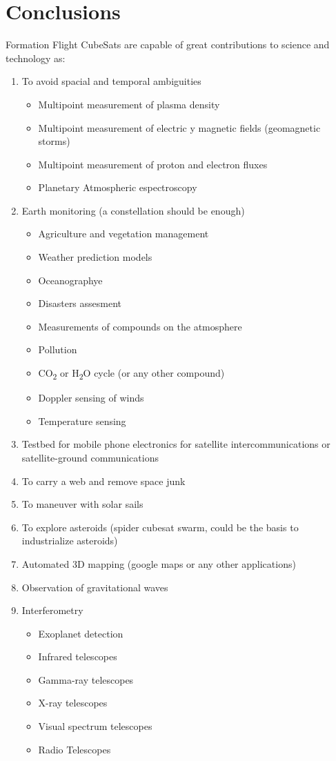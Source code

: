 \section{Conclusions}
Formation Flight CubeSats are capable of great contributions to science
and technology as:
\begin{enumerate}
\item To avoid spacial and temporal ambiguities

\begin{itemize}
\item Multipoint measurement of plasma density
\item Multipoint measurement of electric y magnetic fields (geomagnetic
storms)
\item Multipoint measurement of proton and electron fluxes
\item Planetary Atmospheric espectroscopy
\end{itemize}
\item Earth monitoring (a constellation should be enough)

\begin{itemize}
\item Agriculture and vegetation management
\item Weather prediction models
\item Oceanographye
\item Disasters assesment
\item Measurements of compounds on the atmosphere
\item Pollution
\item CO\textsubscript{2} or H\textsubscript{2}O cycle (or any other compound)
\item Doppler sensing of winds
\item Temperature sensing
\end{itemize}
\item Testbed for mobile phone electronics for satellite intercommunications
or satellite-ground communications
\item To carry a web and remove space junk
\item To maneuver with solar sails
\item To explore asteroids (spider cubesat swarm, could be the basis to
industrialize asteroids)
\item Automated 3D mapping (google maps or any other applications)
\item Observation of gravitational waves
\item Interferometry

\begin{itemize}
\item Exoplanet detection
\item Infrared telescopes
\item Gamma-ray telescopes
\item X-ray telescopes
\item Visual spectrum telescopes
\item Radio Telescopes
\end{itemize}
\end{enumerate}
